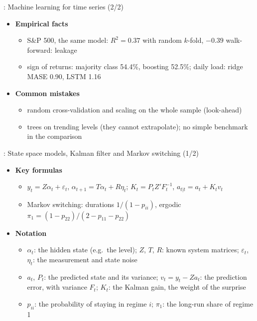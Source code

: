 \begin{frame}{: Machine learning for time series (2/2)}
\itemsize{\footnotesize}
\begin{itemize}
    \item \textbf{Empirical facts}
    \begin{itemize}
        \item S\&P 500, the same model: $R^2 = 0.37$ with random $k$-fold, $\ensuremath{-}0.39$ walk-forward: leakage
        \item sign of returns: majority class 54.4\%, boosting 52.5\%; daily load: ridge MASE 0.90, LSTM 1.16 
    \end{itemize}
    \item \textbf{Common mistakes}
    \begin{itemize}
        \item random cross-validation and scaling on the whole sample (look-ahead)
        \item trees on trending levels (they cannot extrapolate); no simple benchmark in the comparison
    \end{itemize}
\end{itemize}
\end{frame}

\begin{frame}{: State space models, Kalman filter and Markov switching (1/2)}
\itemsize{\footnotesize}
\begin{itemize}
    \item \textbf{Key formulas}
    \begin{itemize}
        \item $y_t = Z\alpha_t + \varepsilon_t$, $\alpha_{t+1} = T\alpha_t + R\eta_t$; $K_t = P_tZ'F_t^{-1}$, $a_{t|t} = a_t + K_tv_t$ 
        \item Markov switching: durations $1/(1 - p_{ii})$, ergodic $\pi_1 = (1 - p_{22})/(2 - p_{11} - p_{22})$ 
    \end{itemize}
    \item \textbf{Notation}
    \begin{itemize}
        \item $\alpha_t$: the hidden state (e.g.\ the level); $Z$, $T$, $R$: known system matrices; $\varepsilon_t$, $\eta_t$: the measurement and state noise
        \item $a_t$, $P_t$: the predicted state and its variance; $v_t = y_t - Za_t$: the prediction error, with variance $F_t$; $K_t$: the Kalman gain, the weight of the surprise
        \item $p_{ii}$: the probability of staying in regime $i$; $\pi_1$: the long-run share of regime 1
    \end{itemize}
\end{itemize}
\end{frame}

